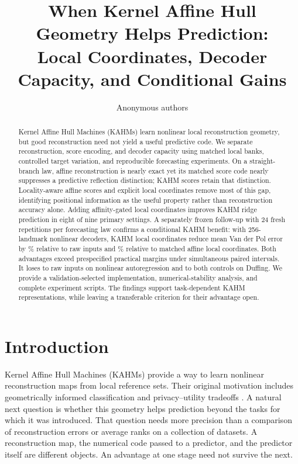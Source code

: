 \documentclass[10pt]{article}
\begin{document}
\title{When Kernel Affine Hull Geometry Helps Prediction:\\
Local Coordinates, Decoder Capacity, and Conditional Gains}
\author{Anonymous authors}
\maketitle

\begin{abstract}
Kernel Affine Hull Machines (KAHMs) learn nonlinear local reconstruction
geometry, but good reconstruction need not yield a useful predictive code.
We separate reconstruction, score encoding, and decoder capacity using
matched local banks, controlled target variation, and reproducible forecasting
experiments. On a straight-branch law, affine reconstruction is nearly exact
yet its matched score code nearly suppresses a predictive reflection distinction;
KAHM scores retain that distinction. Locality-aware affine scores and explicit
local coordinates remove most of this gap, identifying positional information
as the useful property rather than reconstruction accuracy alone. Adding
affinity-gated local coordinates improves KAHM ridge prediction in eight of
nine primary settings. A separately frozen follow-up with 24 fresh repetitions
per forecasting law confirms a conditional KAHM benefit: with 256-landmark
nonlinear decoders, KAHM local coordinates reduce mean Van der Pol error by
\VDPRawWideRelativeGain\% relative to raw inputs and \VDPAffineWideRelativeGain\% relative to matched affine local
coordinates. Both advantages exceed prespecified practical margins under
simultaneous paired intervals. It loses to raw inputs on nonlinear
autoregression and to both controls on Duffing. We provide a validation-selected implementation,
numerical-stability analysis, and complete experiment scripts. The findings
support task-dependent KAHM representations, while leaving a transferable
criterion for their advantage open.
\end{abstract}

\section{Introduction}\label{sec:intro}

Kernel Affine Hull Machines (KAHMs) provide a way to learn nonlinear
reconstruction maps from local reference sets. Their original motivation
includes geometrically informed classification and privacy--utility tradeoffs
\citep{Kumar2024KAHM}. A natural next question is whether this geometry helps
prediction beyond the tasks for which it was introduced. That question needs
more precision than a comparison of reconstruction errors or average ranks
on a collection of datasets. A reconstruction map, the numerical code passed
to a predictor, and the predictor itself are different objects. An advantage
at one stage need not survive the next.
\end{document}
